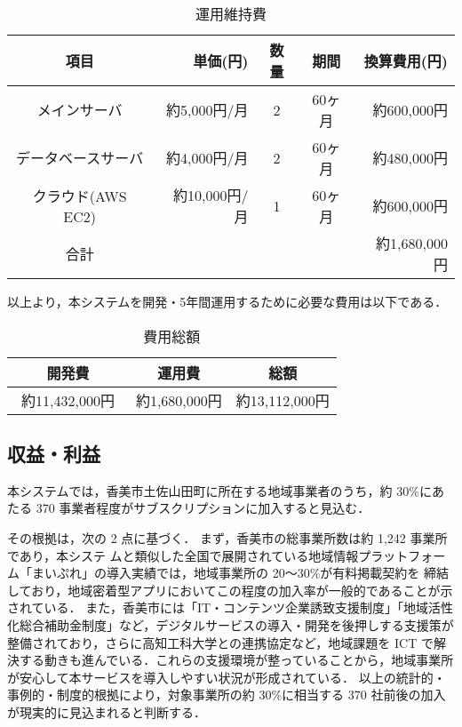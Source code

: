\begin{table}[h]
  \centering
  \caption{運用維持費}
  \label{fig:Q11}
  \begin{tabular}{crccr}
  \hline
  項目  & 単価(円) & 数量  & 期間 & 換算費用(円) \\ \hline\hline
 
メインサーバ  & 約5,000円/月 & 2& 60ヶ月  & 約600,000円 \\ \hline

データベースサーバ & 約4,000円/月 &2& 60ヶ月 & 約480,000円 \\\hline

クラウド(AWS EC2)  &約10,000円/月&1 &60ヶ月 & 約600,000円 \\ \hline\hline

合計 &  & & & 約1,680,000円\\ \hline
\end{tabular}
\end{table}

以上より，本システムを開発・5年間運用するために必要な費用は以下である．
\begin{table}[h]
  \centering
  \caption{費用総額}
  \label{fig:Q12}
  \begin{tabular}{ccc}
  \hline
  開発費 & 運用費 & 総額  \\ \hline\hline
 約11,432,000円　& 約1,680,000円 & 約13,112,000円\\ \hline

\end{tabular}
\end{table}


\subsection{収益・利益}
本システムでは，香美市土佐山田町に所在する地域事業者のうち，約 30\%にあたる 370 事業者程度がサブスクリプションに加入すると見込む．\par
その根拠は，次の 2 点に基づく．
まず，香美市の総事業所数は約 1,242 事業所であり\cite{label4}，本システ
ムと類似した全国で展開されている地域情報プラットフォーム「まいぷれ」\cite{label5}の導入実績では，地域事業所の 20〜30\%が有料掲載契約を
締結しており，地域密着型アプリにおいてこの程度の加入率が一般的であることが示されている．
また，香美市には「IT・コンテンツ企業誘致支援制度」「地域活性化総合補助金制度」など，デジタルサービスの導入・開発を後押しする支援策が整備されており\cite{label6}，さらに高知工科大学との連携協定など，地域課題を ICT で解決する動きも進んでいる．これらの支援環境が整っていることから，地域事業所が安心して本サービスを導入しやすい状況が形成されている．
以上の統計的・事例的・制度的根拠により，対象事業所の約 30\%に相当する 370 社前後の加入が現実的に見込まれると判断する．\par

